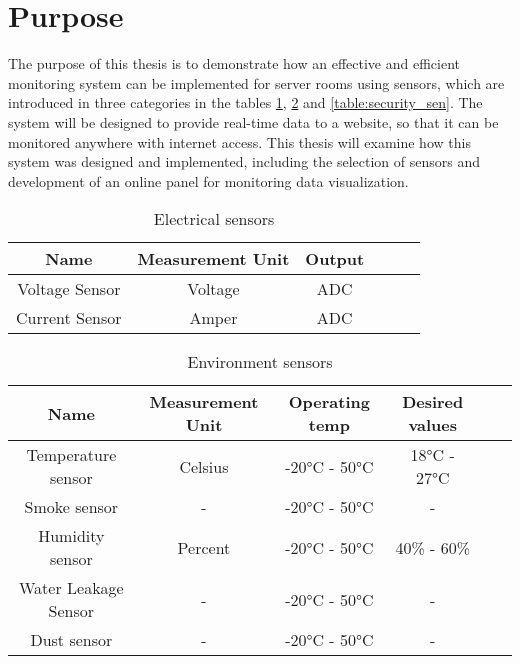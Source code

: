         \section{Purpose}
            The purpose of this thesis is to demonstrate how an effective and efficient monitoring system can be implemented for server rooms using sensors, which are introduced in three categories in the tables \ref{table:electrical_sensors}, \ref{table:envirement_sen} and \ref{table:security_sen}. The system will be designed to provide real-time data to a website, so that it can be monitored anywhere with internet access. This thesis will examine how this system was designed and implemented, including the selection of sensors and development of an online panel for monitoring data visualization.
            
            \begin{table}
                \centering
                \caption{Electrical sensors}
                \begin{tabular}{ |c|c|c|c|c|c|}
                \hline
                {\textbf{Name}} & {\textbf{Measurement Unit}} & {\textbf{Output}} \\ 
                \hline

                Voltage Sensor & Voltage &  ADC \\
                \hline
                
                Current Sensor & Amper &  ADC \\
                \hline
                \end{tabular}
                \label {table:electrical_sensors}
            \end{table}
               
            \begin{table}
                \centering
                \caption{Environment sensors}
                \begin{tabular}{ |c|c|c|c|c|c|}
                    \hline
                    {\textbf{Name}} & {\textbf{Measurement Unit}} & {\textbf{Operating temp}}& {\textbf{Desired values}}   \\ 
                    \hline

                    Temperature sensor & Celsius & -20°C - 50°C & 18°C - 27°C\\
                    \hline
                    Smoke sensor &  - & -20°C - 50°C & -  \\
                    \hline
                    Humidity sensor & Percent &  -20°C - 50°C & 40\% - 60\% \\
                    \hline
                    Water Leakage Sensor &  - & -20°C - 50°C & -  \\
                    \hline
                    Dust sensor &  - & -20°C - 50°C & -  \\
                    \hline
                \end{tabular}
                \label {table:envirement_sen}
            \end{table}
        
